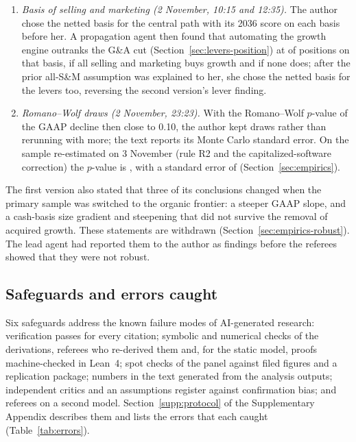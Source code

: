 \begin{enumerate}[leftmargin=*,itemsep=0pt,topsep=2pt]
\item \emph{Basis of selling and marketing (2 November, 10:15 and 12:35).} The author chose the netted basis for the central path with its 2036 score on each basis before her. A propagation agent then found that automating the growth engine outranks the G\&A cut (Section~\ref{sec:levers-position}) at \lpNGEFirstNet{} of \lpNPositions{} positions on that basis, \lpNGEFirstAllSM{} if all selling and marketing buys growth and \lpNGEFirstNoSM{} if none does; after the prior all-S\&M assumption was explained to her, she chose the netted basis for the levers too, reversing the second version's lever finding.
\item \emph{Romano--Wolf draws (2 November, 23:23).} With the Romano--Wolf $p$-value of the GAAP decline then close to 0.10, the author kept \BootB{} draws rather than rerunning with more; the text reports its Monte Carlo standard error. On the sample re-estimated on 3 November (rule R2 and the capitalized-software correction) the $p$-value is \HolmTopRW, with a standard error of \HolmTopRWSe{} (Section~\ref{sec:empirics}).
\end{enumerate}
The first version also stated that three of its conclusions changed when the primary sample was switched to the organic frontier: a steeper GAAP slope, and a cash-basis size gradient and steepening that did not survive the removal of acquired growth. These statements are withdrawn (Section~\ref{sec:empirics-robust}). The lead agent had reported them to the author as findings before the referees showed that they were not robust.

\subsection{Safeguards and errors caught}
Six safeguards address the known failure modes of AI-generated research: verification passes for every citation; symbolic and numerical checks of the derivations, referees who re-derived them and, for the static model, proofs machine-checked in Lean~4; spot checks of the panel against filed figures and a replication package; numbers in the text generated from the analysis outputs; independent critics and an assumptions register against confirmation bias; and referees on a second model. Section~\ref{supp:protocol} of the Supplementary Appendix describes them and lists the errors that each caught (Table~\ref{tab:errors}).

